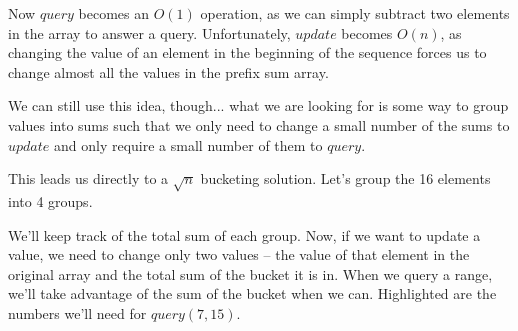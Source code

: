 Now $query$ becomes an $O(1)$ operation, as we can simply subtract two elements in the array to answer a query. Unfortunately, $update$ becomes $O(n)$, as changing the value of an element in the beginning of the sequence forces us to change almost all the values in the prefix sum array.

We can still use this idea, though... what we are looking for is some way to group values into sums such that we only need to change a small number of the sums to $update$ and only require a small number of them to $query$.

This leads us directly to a $\sqrt{n}$ bucketing solution. Let's group the 16 elements into 4 groups.

\begin{center}
{
}
\end{center}

We'll keep track of the total sum of each group. Now, if we want to update a value, we need to change only two values -- the value of that element in the original array and the total sum of the bucket it is in. When we query a range, we'll take advantage of the sum of the bucket when we can. Highlighted are the numbers we'll need for $query(7,15)$.

